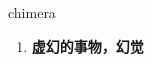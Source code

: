 
\begin{frame}
{\huge chimera}
\begin{center}
\begin{enumerate}\Large
  \item \textbf{虚幻的事物，幻觉}
\end{enumerate}
\end{center}
\end{frame}

